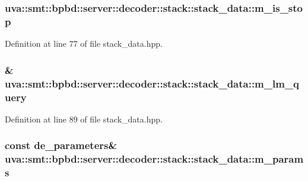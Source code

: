 \subsubsection[{m\+\_\+is\+\_\+stop}]{ uva\+::smt\+::bpbd\+::server\+::decoder\+::stack\+::stack\+\_\+data\+::m\+\_\+is\+\_\+stop}\label{structuva_1_1smt_1_1bpbd_1_1server_1_1decoder_1_1stack_1_1stack__data_a124d8858f72a58128ffacc0c69266cdc}


Definition at line 77 of file stack\+\_\+data.\+hpp.

\hypertarget{structuva_1_1smt_1_1bpbd_1_1server_1_1decoder_1_1stack_1_1stack__data_a8b8cf9dde11ed96934e2dc7b10d4724d}{}
\subsubsection[{m\+\_\+lm\+\_\+query}]{\& uva\+::smt\+::bpbd\+::server\+::decoder\+::stack\+::stack\+\_\+data\+::m\+\_\+lm\+\_\+query}\label{structuva_1_1smt_1_1bpbd_1_1server_1_1decoder_1_1stack_1_1stack__data_a8b8cf9dde11ed96934e2dc7b10d4724d}


Definition at line 89 of file stack\+\_\+data.\+hpp.

\hypertarget{structuva_1_1smt_1_1bpbd_1_1server_1_1decoder_1_1stack_1_1stack__data_a6cc1c4b3b29d164e2cbd8bd7ecfe1481}{}
\subsubsection[{m\+\_\+params}]{\setlength{\rightskip}{0pt plus 5cm}const {\bf de\+\_\+parameters}\& uva\+::smt\+::bpbd\+::server\+::decoder\+::stack\+::stack\+\_\+data\+::m\+\_\+params}\label{structuva_1_1smt_1_1bpbd_1_1server_1_1decoder_1_1stack_1_1stack__data_a6cc1c4b3b29d164e2cbd8bd7ecfe1481}


